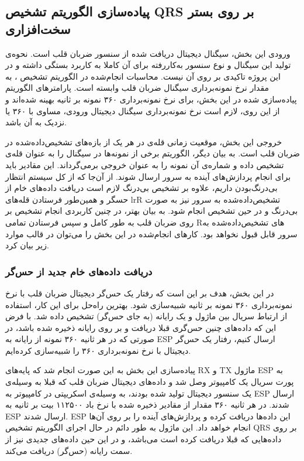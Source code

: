 	\subsection{پیاده‌سازی الگوریتم تشخیص QRS بر روی بستر سخت‌افزاری}
	
ورودی این بخش، سیگنال دیجیتال دریافت شده از سنسور ضربان قلب است. نحوه‌ی تولید این سیگنال و نوع سنسور به‌کاررفته برای آن کاملا به کاربرد بستگی داشته و در این پروژه تاکیدی بر روی آن نیست. محاسبات انجام‌شده در الگوریتم تشخیص ، به مقدار نرخ نمونه‌برداری سیگنال ضربان قلب وابسته است. پارامترهای الگوریتم پیاده‌سازی شده در این بخش، برای نرخ نمونه‌برداری ۳۶۰ نمونه بر ثانیه بهینه شده‌اند و از این روی، لازم است نرخ نمونه‌برداری سیگنال دیجیتال ورودی، مساوی با ۳۶۰ یا نزدیک به آن باشد.

خروجی این بخش، موقعیت زمانی قله‌ی  در هر یک از بازه‌های  تشخیص‌داده‌شده در ضربان قلب است. به بیان دیگر، الگوریتم برخی از نمونه‌ها در سیگنال را به عنوان قله‌ی  تشخیص داده و شماره‌ی آن نمونه را به عنوان خروجی برمی‌گرداند. این مقادیر باید برای انجام پردازش‌های آینده به سرور ارسال شوند. از آن‌جا که از کل سیستم انتظار بی‌درنگ‌بودن داریم، علاوه بر تشخیص بی‌درنگ  لازم است دریافت داد‌ه‌های خام از حسگر و همین‌طور فرستادن قله‌های lr{R} تشخیص‌داده‌شده به سرور نیز به صورت بی‌درنگ و در حین تشخیص  انجام شود. به بیان بهتر، در چنین کاربردی انجام تشخیص  بر روی ضربان قلب به طور کامل و سپس فرستادن تمامی Rهای تشخیص‌داده‌شده به سرور قابل قبول نخواهد بود.
کارهای انجام‌شده در این بخش را می‌توان در قالب موارد زیر بیان کرد. 
\subsubsection{دریافت داده‌های خام جدید از حس‌گر}
در این بخش، هدف بر این است که رفتار یک حس‌گر دیجیتال ضربان قلب با نرخ نمونه‌برداری ۳۶۰ نمونه بر ثانیه شبیه‌سازی شود. بهترین راه‌حل برای این کار، استفاده از ارتباط سریال بین ماژول و یک رایانه (به جای حس‌گر) تشخیص داده شد. با فرض این که داده‌های چنین حس‌گری قبلا دریافت و بر روی رایانه ذخیره شده باشد، در صورتی که در هر ثانیه ۳۶۰ نمونه از رایانه به ESP ارسال کنیم، رفتار یک حس‌گر دیجیتال با نرخ نمونه‌برداری ۳۶۰ را شبیه‌سازی کرده‌ایم.

پیاده‌سازی این بخش به این صورت انجام شد که پایه‌های RX و TX ماژول ESP به پورت سریال یک کامپیوتر وصل شد و داده‌های دیجیتال ضربان قلب که قبلا به وسیله‌ی یک سنسور دیجیتال تولید شده بودند،‌ به وسیله‌ی اسکریپتی در کامپیوتر به ESP ارسال شدند. در هر ثانیه ۳۶۰ مقدار از مقادیر ذخیره شده با نرخ باد ۱۱۲۵۰۰ بیت بر ثانیه به ESP ارسال شدند. ESP این داده‌ها دریافت کرده و پردازش‌های آینده را بر روی آن‌ها انجام خواهد داد. این ماژول به طور دائم در حال اجرای الگوریتم تشخیص QRS بر روی داده‌هایی که قبلا دریافت کرده است می‌باشد، و در این حین داده‌های جدیدی نیز از سمت رایانه (حس‌گر) دریافت می‌کند.
